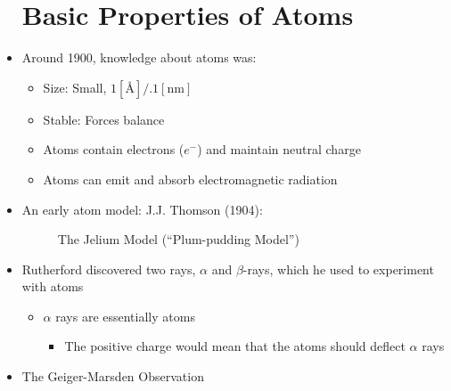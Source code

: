 \begin{itemize}

    \section{Basic Properties of Atoms}

  \item Around 1900, knowledge about atoms was:

    \begin{itemize}

      \item Size: Small, $1[\si{\angstrom}]/.1[\si{\nano\meter}]$

      \item Stable: Forces balance

      \item Atoms contain electrons ($e^-$) and maintain neutral charge

      \item Atoms can emit and absorb electromagnetic radiation

    \end{itemize}

  \item An early atom model: J.J. Thomson (1904):

    \begin{figure}[h!]
      \centering
      
      \caption{The Jelium Model (``Plum-pudding Model'')}
      \label{fig:1}
    \end{figure}

  \item Rutherford discovered two rays, $\alpha$ and $\beta$-rays, which he used to experiment with atoms

    \begin{itemize}

      \item $\alpha$ rays are essentially  atoms

        \begin{itemize}

          \item The positive charge would mean that the atoms should deflect $\alpha$ rays

        \end{itemize}

    \end{itemize}

  \item The Geiger-Marsden Observation


\end{itemize}
